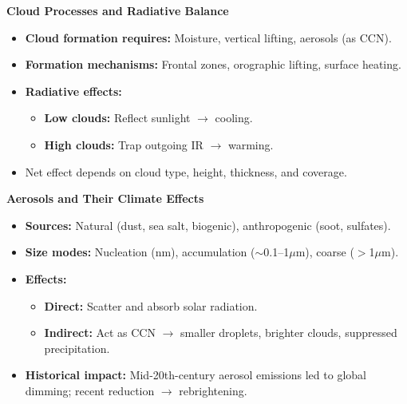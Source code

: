 \documentclass[fontsize=8pt, a4paper, landscape, fleqn]{scrartcl}
\renewcommand{\subsection}[1]{%
    \noindent\colorbox{subsectioncolor}{%
        \parbox{\dimexpr\columnwidth-2\fboxsep}{\color{white}\textbf{#1}}}%
    \vspace{0.5mm}%
}
\begin{document}
\begin{multicols*}{3}[\raggedcolumns]
\subsection{Cloud Processes and Radiative Balance}
\begin{itemize}
    \item \textbf{Cloud formation requires:} Moisture, vertical lifting, aerosols (as CCN).
    \item \textbf{Formation mechanisms:} Frontal zones, orographic lifting, surface heating.
    \item \textbf{Radiative effects:}
    \begin{itemize}
        \item \textbf{Low clouds:} Reflect sunlight $\rightarrow$ cooling.
        \item \textbf{High clouds:} Trap outgoing IR $\rightarrow$ warming.
    \end{itemize}
    \item Net effect depends on cloud type, height, thickness, and coverage.
\end{itemize}

\subsection{Aerosols and Their Climate Effects}
\begin{itemize}
    \item \textbf{Sources:} Natural (dust, sea salt, biogenic), anthropogenic (soot, sulfates).
    \item \textbf{Size modes:} Nucleation (nm), accumulation ($\sim$0.1–1$\mu$m), coarse ($>$1$\mu$m).
    \item \textbf{Effects:}
    \begin{itemize}
        \item \textbf{Direct:} Scatter and absorb solar radiation.
        \item \textbf{Indirect:} Act as CCN $\rightarrow$ smaller droplets, brighter clouds, suppressed precipitation.
    \end{itemize}
    \item \textbf{Historical impact:} Mid-20th-century aerosol emissions led to global dimming; recent reduction $\rightarrow$ rebrightening.
\end{itemize}


\end{multicols*}
\end{document}
